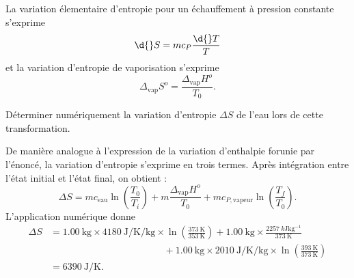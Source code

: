 La variation élementaire d'entropie pour un échauffement à pression constante s'exprime 
\[
\d{}S=mc_P\frac{\d{}T}{T}
\]
 et la variation d'entropie de vaporisation s'exprime 
 \[
 \Delta_{\text{vap}}S^o=\frac{\Delta_{\text{vap}}H^o}{T_0}.
 \]

\repriseEntrainement





\medskip
\begin{enonce}
 Déterminer numériquement la variation d'entropie $\Delta S$ de l'eau lors de cette transformation.

	
\end{enonce}


\begin{corrigeNewpage}
De manière analogue à l'expression de la variation d'enthalpie forunie par l'énoncé, la variation d'entropie s'exprime en trois termes. Après intégration entre l'état initial et l'état final, on obtient : 
\[
\Delta S=mc_{\text{eau}}\ln\left(\frac{T_0}{T_i}\right)+m\frac{\Delta_{\text{vap}}H^o}{T_0}+mc_{P,\text{vapeur}}\ln\left(\frac{T_f}{T_0}\right).
\]
L'application numérique donne 
\begin{align*}
\Delta S&=\SI{1,00}{\kilogram}\times
\SI{4180}{\joule\per\kelvin\per\kilogram} \times
\ln\left(\frac{ \SI{373}{\kelvin} }{\SI{353}{\kelvin}}\right)+\SI{1,00}{\kilogram}\times\frac{ 
\SI{2257}{k\joule\kilogram^{-1}}
}{ \SI{373}{\kelvin} }
\\
&\hspace{5cm}
+\SI{1,00}{\kilogram}\times
\SI{2010}{\joule\per\kelvin\per\kilogram}\times
 \ln\left(\frac{ \SI{393}{\kelvin} }{ \SI{373}{\kelvin} }\right)
 \\
 &=\SI{6390}{\joule\per\kelvin}.
 \end{align*}
\end{corrigeNewpage}


\finEntrainement





